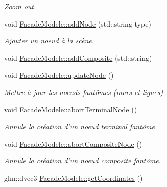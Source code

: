 \begin{DoxyCompactItemize}
\begin{DoxyCompactList}\small\item\em Zoom out. \end{DoxyCompactList}\item 
void \hyperlink{group__inf2990_ga22eeedd655650984efa7da6d3d2564eb}{Facade\-Modele\-::add\-Node} (std\-::string type)
\begin{DoxyCompactList}\small\item\em Ajouter un noeud à la scène. \end{DoxyCompactList}\item 
void \hyperlink{group__inf2990_ga84c93e92df125b294651c3bb04201624}{Facade\-Modele\-::add\-Composite} (std\-::string)
\item 
void \hyperlink{group__inf2990_ga3d780d2a98e5abe59033ba9791065d7d}{Facade\-Modele\-::update\-Node} ()
\begin{DoxyCompactList}\small\item\em Mettre à jour les noeuds fantômes (murs et lignes) \end{DoxyCompactList}\item 
void \hyperlink{group__inf2990_gaf1099ad811d94b7ede2572fbd3c7c89e}{Facade\-Modele\-::abort\-Terminal\-Node} ()
\begin{DoxyCompactList}\small\item\em Annule la création d'un noeud terminal fantôme. \end{DoxyCompactList}\item 
\hypertarget{group__inf2990_gaf17fbb34428b0e0a22ffcdc245e52d19}{void \hyperlink{group__inf2990_gaf17fbb34428b0e0a22ffcdc245e52d19}{Facade\-Modele\-::abort\-Composite\-Node} ()}\label{group__inf2990_gaf17fbb34428b0e0a22ffcdc245e52d19}

\begin{DoxyCompactList}\small\item\em Annule la création d'un noeud composite fantôme. \end{DoxyCompactList}\item 
\hypertarget{group__inf2990_ga4c28397e45d882d3d982ed68978e9e20}{glm\-::dvec3 \hyperlink{group__inf2990_ga4c28397e45d882d3d982ed68978e9e20}{Facade\-Modele\-::get\-Coordinates} ()}\label{group__inf2990_ga4c28397e45d882d3d982ed68978e9e20}


\end{DoxyCompactItemize}
